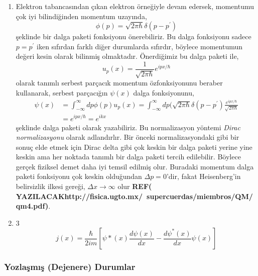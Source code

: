 \documentclass[a4paper,12pt, twoside]{article}
\newcommand{\YAZILACAK}{{\vspace{18pt}\bf\Large \color{red} YAZILACAK}}
\begin{document}
\begin{enumerate}
	
	\item Elektron tabancasından çıkan elektron örneğiyle devam edersek, momentumu çok iyi bilindiğinden momentum uzayında,
	\begin{equation}
	\phi ( p ) = \sqrt { 2 \pi \hbar } \delta ( p - p^\prime )
	\end{equation}
	şeklinde bir dalga paketi fonksiyonu önerebiliriz. Bu dalga fonksiyonu sadece $p=p^\prime$ iken sıfırdan farklı diğer durumlarda sıfırdır, böylece momentumun değeri kesin olarak bilinmiş olmaktadır.
	Önerdiğimiz bu dalga paketi ile,
	\begin{equation}
	u _ { p } ( x ) = \frac { 1 } { \sqrt { 2 \pi \hbar } } e ^ { i p x / \hbar }
	\end{equation}
	olarak tanımlı serbest parçacık momentum özfonksiyonunu beraber kullanarak, serbest parçacığın $\psi(x)$ dalga fonksiyonunu,
	\begin{align}
	\psi ( x )  
	&= \int _ { - \infty } ^ { \infty } d p \phi ( p ) u_p(x)
	= \int _ { - \infty } ^ { \infty } d p  (\sqrt { 2 \pi \hbar } \delta ( p - p^\prime ) \frac { e ^ { i p x /\hbar } } { \sqrt { 2 \pi \hbar } }\\
	&= e ^ { i p x /\hbar } =  e ^ { i k x }
	\end{align}
	şeklinde dalga paketi olarak yazabiliriz. Bu normalizasyon yöntemi \emph{Dirac normalizasyonu} olarak adlandırlır. Bir önceki normalizasyondaki gibi bir sonuç elde etmek için Dirac delta gibi çok keskin bir dalga paketi yerine yine keskin ama her noktada tanımlı bir dalga paketi tercih edilebilir. Böylece gerçek fiziksel demet daha iyi temsil edilmiş olur. Buradaki momentum dalga paketi fonksiyonu çok keskin olduğundan $\Delta p = 0$'dir, fakat Heisenberg'in belirsizlik ilkesi gereği, $\Delta x \rightarrow \infty$ olur {\bf REF(\YAZILACAK http://fisica.ugto.mx/~supercuerdas/miembros/QM/qm4.pdf)}.
	
	\item 3		
	\begin{equation}
	j ( x ) = \frac { \hbar } { 2 i m } \left[ \psi * ( x ) \frac { d \psi ( x ) } { d x } - \frac { d \psi ^ { * } ( x ) } { d x } \psi ( x ) \right]
	\end{equation}
\end{enumerate}

\subsubsection{Yozlaşmış (Dejenere) Durumlar}
\end{document}
